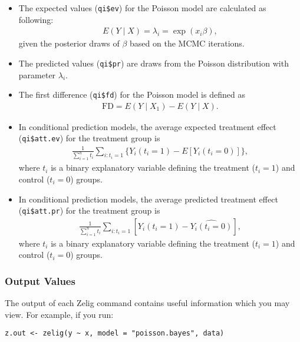 \begin{itemize}
\item The expected values (\texttt{qi\$ev}) for the Poisson model are
calculated as following:
\begin{eqnarray*}
E(Y\mid X) = \lambda_i = \exp(x_i \beta),
\end{eqnarray*}
given the posterior draws of $\beta$ based on the MCMC iterations.

\item The predicted values (\texttt{qi\$pr}) are draws from the Poisson
distribution with parameter $\lambda_i$.

\item The first difference (\texttt{qi\$fd}) for the Poisson model is defined
as
\begin{eqnarray*}
\text{FD}=E(Y\mid X_{1})-E(Y\mid X).
\end{eqnarray*}

\item In conditional prediction models, the average expected treatment effect
(\texttt{qi\$att.ev}) for the treatment group is
\begin{eqnarray*}
\frac{1}{\sum_{i=1}^n t_{i}}\sum_{i:t_{i}=1}\{Y_{i}(t_{i}=1)-E[Y_{i}(t_{i}=0)]\},
\end{eqnarray*}
where $t_{i}$ is a binary explanatory variable defining the treatment
($t_{i}=1$) and control ($t_{i}=0$) groups.

\item In conditional prediction models, the average predicted treatment effect
(\texttt{qi\$att.pr}) for the treatment group is
\begin{eqnarray*}
\frac{1}{\sum_{i=1}^n t_{i}}\sum_{i:t_{i}=1}[Y_{i}(t_{i}=1)-\widehat{Y_{i}(t_{i}=0)}],
\end{eqnarray*}
where $t_{i}$ is a binary explanatory variable defining the treatment
($t_{i}=1$) and control ($t_{i}=0$) groups.
\end{itemize}

\subsubsection{Output Values}

The output of each Zelig command contains useful information which you may
view. For example, if you run:
\begin{verbatim}
z.out <- zelig(y ~ x, model = "poisson.bayes", data)
\end{verbatim}


